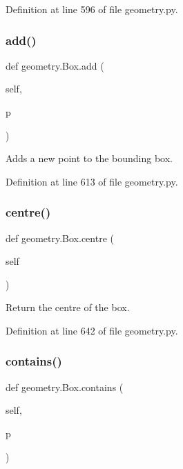 Definition at line 596 of file geometry.\+py.

\mbox{\label{classgeometry_1_1Box_a4b0f4675b22c67b531b00459cf6858b5}} 
\subsubsection{\texorpdfstring{add()}{add()}}
{\footnotesize\ttfamily def geometry.\+Box.\+add (\begin{DoxyParamCaption}\item[{}]{self,  }\item[{}]{p }\end{DoxyParamCaption})}

\begin{DoxyVerb}Adds a new point to the bounding box.\end{DoxyVerb}
 

Definition at line 613 of file geometry.\+py.

\mbox{\label{classgeometry_1_1Box_aaab7456e78cc5b951e1b832b6816d332}} 
\subsubsection{\texorpdfstring{centre()}{centre()}}
{\footnotesize\ttfamily def geometry.\+Box.\+centre (\begin{DoxyParamCaption}\item[{}]{self }\end{DoxyParamCaption})}

\begin{DoxyVerb}Return the centre of the box.\end{DoxyVerb}
 

Definition at line 642 of file geometry.\+py.

\mbox{\label{classgeometry_1_1Box_af184892d7008637d2d34a9cc4fa4fdd5}} 
\subsubsection{\texorpdfstring{contains()}{contains()}}
{\footnotesize\ttfamily def geometry.\+Box.\+contains (\begin{DoxyParamCaption}\item[{}]{self,  }\item[{}]{p }\end{DoxyParamCaption})}

